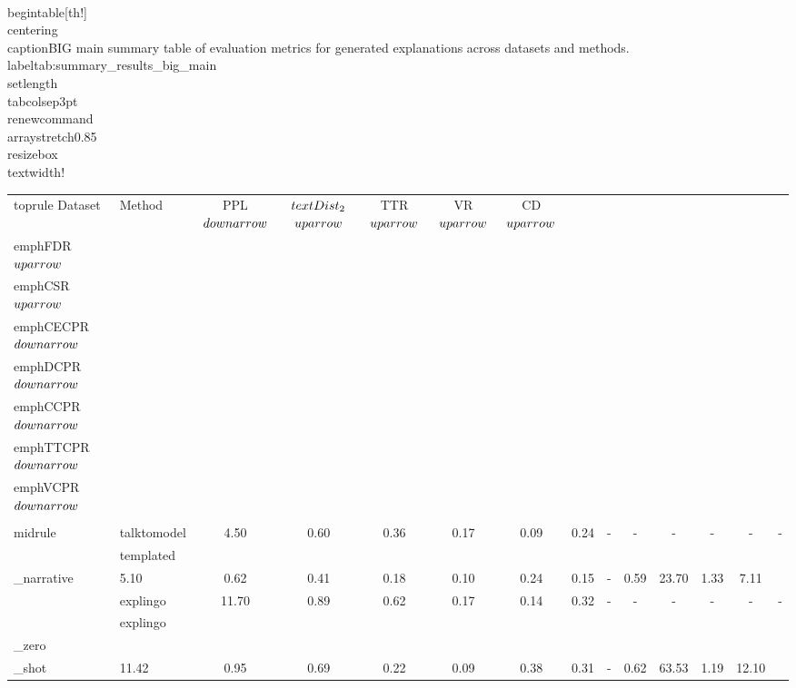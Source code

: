 \\begin{table}[th!]
\\centering
\\caption{BIG main summary table of evaluation metrics for generated explanations across datasets and methods.}
\\label{tab:summary_results_big_main}
\\setlength{\\tabcolsep}{3pt}
\\renewcommand{\\arraystretch}{0.85}
\\resizebox{\\textwidth}{!}{
    \begin{tabular}{llcccccccccccc}
    \\toprule
    Dataset & Method & PPL $\\downarrow$ & $\\text{Dist}_2$ $\\uparrow$ & TTR $\\uparrow$ & VR $\\uparrow$ & CD $\\uparrow$ & \\emph{FDR} $\\uparrow$ & \\emph{CSR} $\\uparrow$ & \\emph{CECPR} $\\downarrow$ & \\emph{DCPR} $\\downarrow$ & \\emph{CCPR} $\\downarrow$ & \\emph{TTCPR} $\\downarrow$ & \\emph{VCPR} $\\downarrow$\\
    \\midrule
    \multirow{7}{*}{Compas} & talktomodel & 4.50 & 0.60 & 0.36 & 0.17 & 0.09 & 0.24 & - & - & - & - & - & -\\
     & templated\\_narrative & 5.10 & 0.62 & 0.41 & 0.18 & 0.10 & 0.24 & 0.15 & - & 0.59 & 23.70 & 1.33 & 7.11\\
     & explingo & 11.70 & 0.89 & 0.62 & 0.17 & 0.14 & 0.32 & - & - & - & - & - & -\\
     & explingo\\_zero\\_shot & 11.42 & 0.95 & 0.69 & 0.22 & 0.09 & 0.38 & 0.31 & - & 0.62 & 63.53 & 1.19 & 12.10\\

\end{tabular}}
